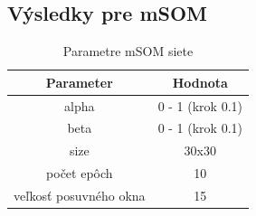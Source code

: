 \subsection{Výsledky pre mSOM}

\begin{table}[h!]
    \centering
    \begin{tabular}{|c|c|} 
     \hline
     Parameter & Hodnota \\ 
     \hline\hline
     alpha & 0 - 1 (krok 0.1)  \\ 
     \hline
     beta & 0 - 1  (krok 0.1) \\ 
     \hline
     size & 30x30  \\
     \hline
     počet epôch & 10  \\
     \hline
     veľkosť posuvného okna & 15  \\
     \hline
    \end{tabular}
    \caption{Parametre mSOM siete}
    \label{table:1}
    \end{table}
    

